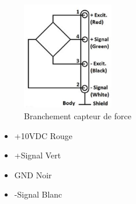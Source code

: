 \documentclass[11pt]{article}
\begin{document}
\begin{figure}[!h]
    \centering
    \includegraphics[width=150px]{cablage_fn3060.png}
    \caption{Branchement capteur de force}
\end{figure}

\begin{itemize}
	\item +10VDC  Rouge
	\item +Signal Vert
	\item GND     Noir
	\item -Signal Blanc
\end{itemize}
\end{document}
